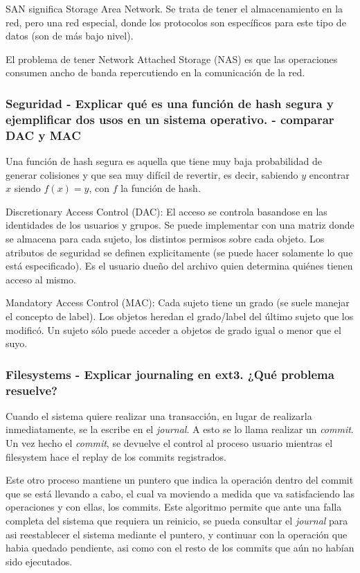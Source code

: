 SAN significa Storage Area Network. Se trata de tener el almacenamiento en la red, pero una red especial, donde los protocolos son específicos para este tipo de datos (son de más bajo nivel). 

El problema de tener Network Attached Storage (NAS) es que las operaciones consumen ancho de banda repercutiendo en la comunicación de la red.

\subsubsection{Seguridad - Explicar qué es una función de hash segura y ejemplificar dos usos en un sistema operativo. - comparar DAC y MAC}

Una función de hash segura es aquella que tiene muy baja probabilidad de generar colisiones y que sea muy difícil de revertir, es decir, sabiendo $y$ encontrar $x$ siendo $f(x) = y$, con $f$ la función de hash.

Discretionary Access Control (DAC): El acceso se controla basandose en las identidades de los usuarios y grupos. Se puede implementar con una matriz donde se almacena para cada sujeto, los distintos permisos sobre cada objeto. Los atributos de seguridad se definen explicitamente (se puede hacer solamente lo que está especificado). Es el usuario dueño del archivo quien determina quiénes tienen acceso al mismo.

Mandatory Access Control (MAC): Cada sujeto tiene un grado (se suele manejar el concepto de label). Los objetos heredan el grado/label del último sujeto que los modificó. Un sujeto sólo puede acceder a objetos de grado igual o menor que el suyo.

\subsubsection{Filesystems - Explicar journaling en ext3. ¿Qué problema resuelve?}

Cuando el sistema quiere realizar una transacción, en lugar de realizarla inmediatamente, se la escribe en el \textit{journal}. A esto se lo llama realizar un \textit{commit}. Un vez hecho el \textit{commit}, se devuelve el control al proceso usuario mientras el filesystem hace el replay de los commits registrados.

Este otro proceso mantiene un puntero que indica la operación dentro del commit que se está llevando a cabo, el cual va moviendo a medida que va satisfaciendo las operaciones y con ellas, los commits. Este algoritmo permite que ante una falla completa del sistema que requiera un reinicio, se pueda consultar el \textit{journal} para asi reestablecer el sistema mediante el puntero, y continuar con la operación que habia quedado pendiente, asi como con el resto de los commits que aún no habían sido ejecutados.

